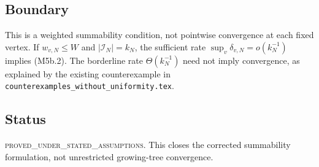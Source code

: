 \subsection*{Boundary}

This is a weighted summability condition, not pointwise convergence at each
fixed vertex. If $w_{v,N}\le W$ and $|\mathcal I_N|=k_N$, the sufficient rate
$\sup_v\delta_{v,N}=o(k_N^{-1})$ implies (M5b.2). The borderline rate
$\Theta(k_N^{-1})$ need not imply convergence, as explained by the existing
counterexample in
\texttt{counterexamples\_without\_uniformity.tex}.

\subsection*{Status}

\textsc{proved\_under\_stated\_assumptions}. This closes the corrected
summability formulation, not unrestricted growing-tree convergence.
